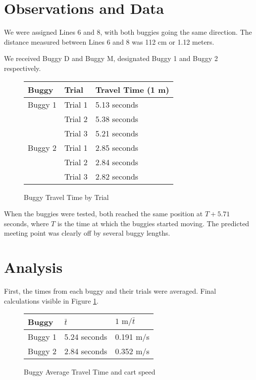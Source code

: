 \documentclass[12pt,twoside]{article}
\begin{document}
\section{Observations and Data}

We were assigned Lines 6 and 8, with both buggies going the same direction. The
distance measured between Lines 6 and 8 was 112 cm or 1.12 meters.

We received Buggy D and Buggy M, designated Buggy 1 and Buggy 2 respectively.

\begin{figure}[H]
    \centering
    \begin{tabular}{| l l l |}
        \hline
        Buggy & Trial & Travel Time (1 m) \\ \hline
        Buggy 1 & Trial 1 & 5.13 seconds \\
                & Trial 2 & 5.38 seconds \\
                & Trial 3 & 5.21 seconds \\ \hline
        Buggy 2 & Trial 1 & 2.85 seconds \\
                & Trial 2 & 2.84 seconds \\
                & Trial 3 & 2.82 seconds \\
        \hline
    \end{tabular}
    \caption{Buggy Travel Time by Trial}
\end{figure}

When the buggies were tested, both reached the same position at $T+5.71$ seconds,
where $T$ is the time at which the buggies started moving. The predicted meeting
point was clearly off by several buggy lengths.

\section{Analysis}

First, the times from each buggy and their trials were averaged. Final
calculations visible in Figure \ref{fig:average}.

\begin{figure}[h]
    \centering
    \begin{tabular}{| l l l |}
        \hline
        Buggy & $\bar{t}$ & $\text{1 m}/\bar{t}$ \\ \hline
        Buggy 1 & 5.24 seconds & 0.191 m/s \\
        Buggy 2 & 2.84 seconds & 0.352 m/s \\
        \hline
    \end{tabular}
    \caption{Buggy Average Travel Time and cart speed}
    \label{fig:average}
\end{figure}
\end{document}
